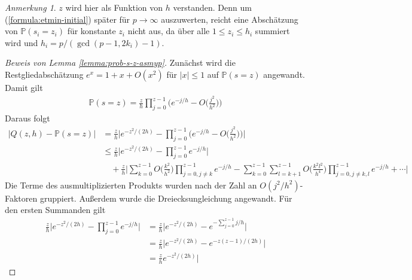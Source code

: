 \documentclass[a4paper, 11pt, ngerman]{article}
\renewcommand{\P}{\mathbb{P}}
\theoremstyle{definition}
\theoremstyle{plain}
\theoremstyle{remark}
\newtheorem*{remark*}{Anmerkung}
\begin{document}
\begin{remark*}
    $z$ wird hier als Funktion von $h$ verstanden. Denn um (\ref{formula:etmin-initial}) später für $p \to \infty$ auszuwerten, reicht eine Abschätzung von $\P(s_i = z_i)$ für konstante $z_i$ nicht aus, da über alle $1 \le z_i \le h_i$ summiert wird und $h_i = p/(\gcd(p - 1, 2k_i) - 1)$.
\end{remark*}

\begin{proof}[Beweis von Lemma \ref{lemma:prob-s-z-asmyp}]
    Zunächst wird die Restgliedabschätzung $e^x = 1 + x + O(x^2)$ für $|x| \le 1$ auf $\P(s = z)$ angewandt. Damit gilt
    \begin{align*}
        \P(s = z) = \frac z h \prod_{j = 0}^{z - 1}
        \Bigg ( e^{-j/h} - O \bigg (\frac {j^2} {h^2} \bigg ) \Bigg )
    \end{align*}
    Daraus folgt
    \begin{align*}
        \vert Q(z, h) - \P(s = z) \vert
         & = \frac z h \Bigg \vert
        e^{-z^2/(2h)} -
        \prod_{j = 0}^{z - 1}
        \Bigg ( e^{-j/h} - O \bigg (\frac {j^2} {h^2} \bigg ) \Bigg )
        \Bigg \vert                      \\
         & \le \frac z h \Bigg \vert
        e^{-z^2/(2h)} -
        \prod_{j = 0}^{z - 1} e^{-j/h}
        \Bigg \vert                      \\
         & \quad + \frac z h \Bigg \vert
        \sum_{k = 0}^{z - 1} O \bigg ( \frac {k^2} {h^2} \bigg )
        \prod_{j = 0, j \ne k}^{z - 1} e^{-j/h}
        - \sum_{k = 0}^{z - 1}\sum_{l = k+1}^{z - 1}
        O \bigg ( \frac {k^2l^2} {h^4} \bigg )
        \prod_{j = 0, j \ne k,l}^{z - 1} e^{-j/h}
        + \cdots
        \Bigg \vert
    \end{align*}
    Die Terme des ausmultiplizierten Produkts wurden nach der Zahl an $O(j^2/h^2)$-Faktoren gruppiert. Außerdem wurde die Dreiecksungleichung angewandt. Für den ersten Summanden gilt
    \begin{align*}
        \frac z h \Bigg \vert
        e^{-z^2/(2h)} -
        \prod_{j = 0}^{z - 1} e^{-j/h}
        \Bigg \vert
         & = \frac z h \Big \vert
        e^{-z^2/(2h)} -
        e^{-\sum_{j = 0}^{z - 1} j/h}
        \Big \vert                                       \\
         & = \frac z h \Big \vert
        e^{-z^2/(2h)} -  e^{-z(z - 1)/(2h)}
        \Big \vert                                       \\
         & = \frac z h e^{-z^2/(2h)} \Big \vert

\end{align*}
\end{proof}
\end{document}

